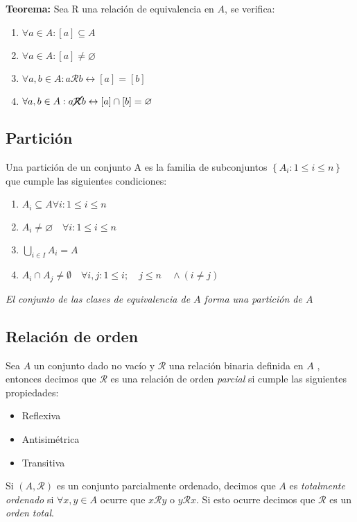 \documentclass[a4paper, twoside]{article}
\begin{document}
\textbf{Teorema:} Sea R una relación de equivalencia en $A$, se verifica:
\begin{enumerate}
	\item $\forall a \in A: \left[a\right] \subseteq A$
	\item $\forall a \in A: \left[a\right] \neq \varnothing$
	\item $\forall a,b \in A: a\mathcal{R} b \leftrightarrow \left[a\right] = \left[b\right]$
	\item $\forall a,b \in A: a \cancel{\mathcal{R}} b \leftrightarrow \left[a\right] \cap \left[b\right]= \varnothing$
\end{enumerate}

\subsection{Partición}
Una partición de un conjunto A es la familia de subconjuntos $\left\{ A_i: 1 \leq i \leq n\right\}$ que cumple las siguientes condiciones:
\begin{enumerate}
	\item $A_i \subseteq A \forall i: 1 \leq i \leq n$
	\item $A_i \neq \varnothing \quad \forall i: 1 \leq i \leq n$
	\item $\bigcup_{i\in I} A_i = A$
	\item $A_i \cap A_j \neq \emptyset \quad \forall i,j: 1\leq i ; \quad j \leq n	\quad \wedge (i \neq j)$
\end{enumerate}

\emph{El conjunto de las clases de equivalencia de $A$ forma una partición de $A$}

\subsection{Relación de orden}
Sea $A$ un conjunto dado no vacío y $\mathcal{R}$ una relación binaria definida en $A$ , entonces decimos que $\mathcal{R}$ es una relación de orden \emph{parcial} si cumple las siguientes propiedades:
\begin{itemize}
	\item Reflexiva
	\item Antisimétrica
	\item Transitiva
\end{itemize}

Si $(A,\mathcal{R})$ es un conjunto parcialmente ordenado, decimos que $A$ es \emph{totalmente ordenado} si $\forall x,y \in A$ ocurre que $x\mathcal{R}y$ o $y\mathcal{R}x$.
Si esto ocurre decimos que $\mathcal{R}$ es un \emph{orden total}.
\end{document}
